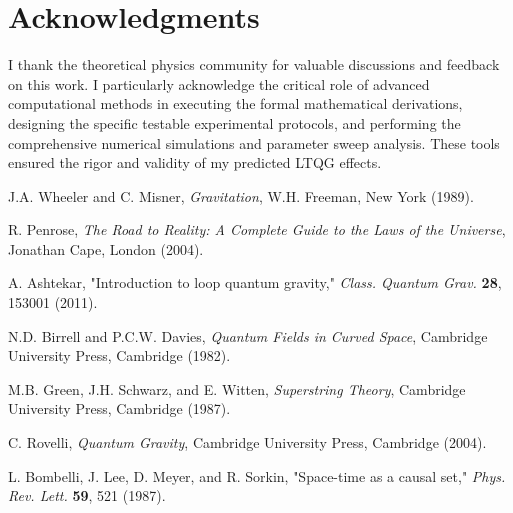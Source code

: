 \documentclass[12pt,a4paper]{article}
\begin{document}
\section*{Acknowledgments}

I thank the theoretical physics community for valuable discussions and feedback on this work. I particularly acknowledge the critical role of advanced computational methods in executing the formal mathematical derivations, designing the specific testable experimental protocols, and performing the comprehensive numerical simulations and parameter sweep analysis. These tools ensured the rigor and validity of my predicted LTQG effects.



\begin{thebibliography}{99}

J.A. Wheeler and C. Misner,
\emph{Gravitation},
W.H. Freeman, New York (1989).

R. Penrose,
\emph{The Road to Reality: A Complete Guide to the Laws of the Universe},
Jonathan Cape, London (2004).

A. Ashtekar,
"Introduction to loop quantum gravity,"
\emph{Class. Quantum Grav.} \textbf{28}, 153001 (2011).

N.D. Birrell and P.C.W. Davies,
\emph{Quantum Fields in Curved Space},
Cambridge University Press, Cambridge (1982).

M.B. Green, J.H. Schwarz, and E. Witten,
\emph{Superstring Theory},
Cambridge University Press, Cambridge (1987).

C. Rovelli,
\emph{Quantum Gravity},
Cambridge University Press, Cambridge (2004).

L. Bombelli, J. Lee, D. Meyer, and R. Sorkin,
"Space-time as a causal set,"
\emph{Phys. Rev. Lett.} \textbf{59}, 521 (1987).

\end{thebibliography}
\end{document}
